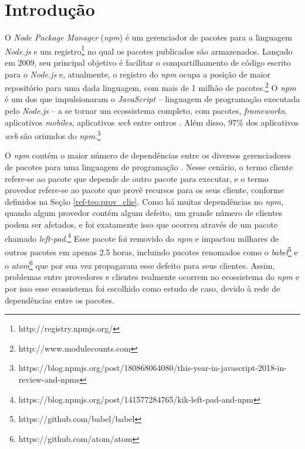 \chapter{Introdução}
\label{cap:introducao}

O \textit{Node Package Manager} (\textit{npm}) é um gerenciador de pacotes para a linguagem \textit{Node.js} e um registro\footnote{http://registry.npmjs.org/} no qual os pacotes publicados são armazenados. Lançado em 2009, seu principal objetivo é facilitar o compartilhamento de código escrito para o \textit{Node.js} e, atualmente, o registro do \textit{npm} ocupa a posição de maior repositório para uma dada linguagem, com mais de 1 milhão de pacotes.\footnote{http://www.modulecounts.com} O \textit{npm} é um dos que impulsionaram o \textit{JavaScript} -- linguagem de programação executada pelo \textit{Node.js} -- a se tornar um ecossistema completo, com pacotes, \textit{frameworks}, aplicativos \textit{mobiles}, aplicativos \textit{web} entre outros \cite{introduction:npm}. Além disso,  97\% dos aplicativos \textit{web} são oriundos do \textit{npm}.\footnote{https://blog.npmjs.org/post/180868064080/this-year-in-javascript-2018-in-review-and-npms}

O \textit{npm} contém o maior número de dependências entre os diversos gerenciadores de pacotes para uma linguagem de programação \cite{teorical_reference:npm_2}. Nesse cenário, o termo cliente refere-se ao pacote que depende de outro pacote para executar, e o termo provedor refere-se ao pacote que provê recursos para os seus cliente, conforme definidos na Seção \ref{ref-teo:prov_clie}. Como há muitas dependências no \textit{npm}, quando algum provedor contém algum defeito, um grande número de clientes podem ser afetados, e foi exatamente isso que ocorreu através de um pacote chamado \textit{left-pad}.\footnote{https://blog.npmjs.org/post/141577284765/kik-left-pad-and-npm} Esse pacote foi removido do \textit{npm} e impactou milhares de outros pacotes em apenas 2.5 horas, incluindo pacotes renomados como o \textit{babel}\footnote{https://github.com/babel/babel} e o \textit{atom}\footnote{https://github.com/atom/atom} que por sua vez propagaram esse defeito para seus clientes. Assim, problemas entre provedores e clientes realmente ocorrem no ecossistema do \textit{npm} e por isso esse ecossistema foi escolhido como estudo de caso, devido à rede de dependências entre os pacotes.

